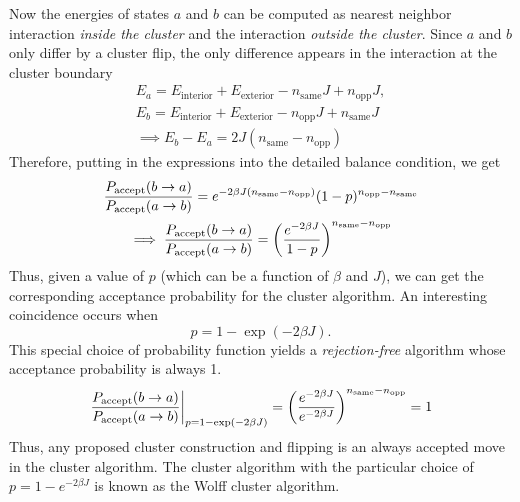 \documentclass[../thesis_main.tex]{subfiles}
\begin{document}
Now the energies of states $a$ and $b$ can be computed as nearest neighbor interaction \textit{inside the cluster} and the interaction \textit{outside the cluster}. Since $a$ and $b$ only differ by a cluster flip, the only difference appears in the interaction at the cluster boundary
\begin{subequations}
    \begin{gather}
        E_a = E_\text{interior} + E_\text{exterior} - n_\text{same}J + n_\text{opp} J, \\
        E_b = E_\text{interior} + E_\text{exterior} - n_\text{opp}J + n_\text{same} J \\ 
        \implies E_b - E_a = 2J(n_\text{same} - n_\text{opp})
    \end{gather}
\end{subequations}
Therefore, putting in the expressions into the detailed balance condition, we get
\begin{subequations}
    \begin{gather}
        \frac{P_\text{accept}(b \to a)}{P_\text{accept}(a \to b)} = e^{-2\beta J(n_\text{same} - n_\text{opp})} (1-p)^{n_\text{opp} - n_\text{same}} \\
        \implies \frac{P_\text{accept}(b \to a)}{P_\text{accept}(a \to b)} = \qty(\frac{e^{-2\beta J}}{1-p})^{n_\text{same} - n_\text{opp}}
    \end{gather}
\end{subequations}
Thus, given a value of $p$ (which can be a function of $\beta$ and $J$), we can get the corresponding acceptance probability for the cluster algorithm. An interesting coincidence occurs when 
\begin{equation}
    p = 1 - \exp(-2\beta J).
\end{equation}
This special choice of probability function yields a \textit{rejection-free} algorithm whose acceptance probability is always 1. 
\begin{equation}
    \eval{\frac{P_\text{accept}(b \to a)}{P_\text{accept}(a \to b)}}_{p = 1 - \exp(-2\beta J)} = \qty(\frac{e^{-2\beta J}}{e^{-2\beta J}})^{n_\text{same} - n_\text{opp}} = 1
\end{equation}
Thus, any proposed cluster construction and flipping is an always accepted move in the cluster algorithm. The cluster algorithm with the particular choice of $p = 1 - e^{-2\beta J}$ is known as the Wolff cluster algorithm. 
\end{document}
